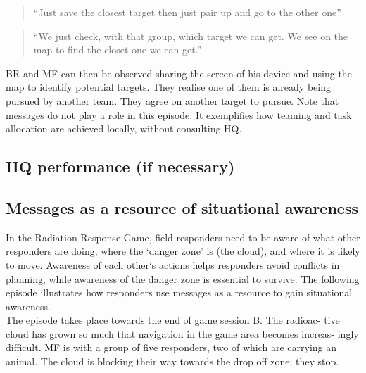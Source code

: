 \begin{quote}
``Just save the closest target then just pair up and go to the other one'' 
\end{quote}


\begin{quote}
``We just check, with that group, which target we can get. We see on the map to find the closet one we can get.''
\end{quote}

BR and MF can then be observed sharing the screen of his device and using the map to identify potential targets. They realise one of them is already being pursued by another team. They agree on another target to pursue. Note that messages do not play a role in this episode. It exemplifies how teaming and task allocation are achieved locally, without consulting HQ.\\

\subsection{HQ performance (if necessary)}


\subsection{Messages as a resource of situational awareness}
In the Radiation Response Game, field responders need to be aware of what other responders are doing, where the `danger zone' is (the cloud), and where it is likely to move. Awareness of each other`s actions helps responders avoid conflicts in planning, while awareness of the danger zone is essential to survive. The following episode illustrates how responders use messages as a resource to gain situational awareness.\\

The episode takes place towards the end of game session B. The radioac- tive cloud has grown so much that navigation in the game area becomes increas- ingly difficult. MF is with a group of five responders, two of which are carrying an animal. The cloud is blocking their way towards the drop off zone; they stop.\\

\noindent{}

